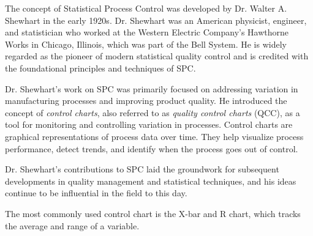 \documentclass{ximera}
\begin{document}
\begin{center}
      \end{center}

The concept of Statistical Process Control was developed by Dr. Walter A. Shewhart in the early 1920s. Dr. Shewhart was an American physicist, engineer, and statistician who worked at the Western Electric Company's Hawthorne Works in Chicago, Illinois, which was part of the Bell System. He is widely regarded as the pioneer of modern statistical quality control and is credited with the foundational principles and techniques of SPC.

Dr. Shewhart's work on SPC was primarily focused on addressing variation in manufacturing processes and improving product quality. He introduced the concept of \emph{control charts}, also referred to as \emph{quality control charts} (QCC), as a tool for monitoring and controlling variation in processes. Control charts are graphical representations of process data over time. They help visualize process performance, detect trends, and identify when the process goes out of control.

Dr. Shewhart's contributions to SPC laid the groundwork for subsequent developments in quality management and statistical techniques, and his ideas continue to be influential in the field to this day.

  The most commonly used control chart is the X-bar and R chart, which tracks the average and range of a variable.

 
\end{document}
